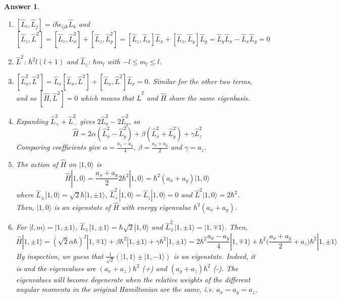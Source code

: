 \documentclass[a4paper]{article}
\newtheorem{ans}{Answer}[subsection]
\theoremstyle{new}
\begin{document}
\begin{ans}\leavevmode
\begin{enumerate}[label=(\roman*)]
\item $[\hat{L}_i,\hat{L}_j]=i\hbar\epsilon_{ijk}\hat{L}_k$ and $$[\hat{L}_z,\hat{L}^2]=[\hat{L}_z,\hat{L}_x^2]+[\hat{L}_z,\hat{L}_y^2]=[\hat{L}_z,\hat{L}_x]\hat{L}_x+[\hat{L}_z,\hat{L}_y]\hat{L}_y=\hat{L}_y\hat{L}_x-\hat{L}_x\hat{L}_y=0$$
\item $\hat{L}^2$: $\hbar^2l(l+1)$ and $\hat{L}_z$: $\hbar m_l$ with $-l\leq m_l\leq l$.
\item $[\hat{L}_x^2,\hat{L}^2]=\hat{L}_x[\hat{L}_x,\hat{L}^2]+[\hat{L}_x,\hat{L}^2]\hat{L}_x=0$. Similar for the other two terms, and so $[\hat{H},\hat{L}^2]=0$ which means that $\hat{L}^2$ and $\hat{H}$ share the same eigenbasis.
\item Expanding $\hat{L}_+^2+\hat{L}_-^2$ gives $2\hat{L}_x^2-2\hat{L}_y^2$, so
$$\hat{H}=2\alpha(\hat{L}_x^2-\hat{L}_y^2)+\beta(\hat{L}_x^2+\hat{L}_y^2)+\gamma\hat{L}_z^2$$
Comparing coefficients give $\alpha=\frac{a_x-a_y}{4}$, $\beta=\frac{a_x+a_y}{2}$ and $\gamma=a_z$.
\item The action of $\hat{H}$ on $|1,0\rangle$ is
$$\hat{H}|1,0\rangle=\frac{a_x+a_y}{2}2\hbar^2|1,0\rangle=\hbar^2(a_x+a_y)|1,0\rangle$$
where $\hat{L}_\pm|1,0\rangle=\sqrt{2}\hbar|1,\pm1\rangle$, $\hat{L}_+^2|1,0\rangle=\hat{L}_z|1,0\rangle=0$ and $\hat{L}^2|1,0\rangle=2\hbar^2$. Then, $|1,0\rangle$ is an eigenstate of $\hat{H}$ with energy eigenvalue $\hbar^2(a_x+a_y)$.
\item For $|l,m\rangle=|1,\pm1\rangle$, $\hat{L}_\mp|1,\pm1\rangle=\hbar\sqrt{2}|1,0\rangle$ and $\hat{L}_\mp^2|1,\pm1\rangle=|1,\mp1\rangle$. Then,
$$\hat{H}|1,\pm1\rangle=(\sqrt{2}\alpha\hbar)^2|1,\mp1\rangle+\beta\hbar^2|1,\pm1\rangle+\gamma\hbar^2|1,\pm1\rangle=2\hbar^2\frac{a_x-a_y}{4}|1,\mp1\rangle+\hbar^2\bigg(\frac{a_x+a_y}{2}+a_z\bigg)\hbar^2|1,\pm1\rangle$$
By inspection, we guess that $\frac{1}{\sqrt{2}}(|1,1\rangle\pm|1,-1\rangle)$ is an eigenstate. Indeed, it is and the eigenvalues are $(a_x+a_z)\hbar^2$ (+) and $(a_y+a_z)\hbar^2$ (-). The eigenvalues will become degenerate when the relative weights of the different angular momenta in the original Hamiltonian are the same, i.e. $a_x=a_y=a_z$.
\end{enumerate}
\end{ans}
\newpage
\end{document}
